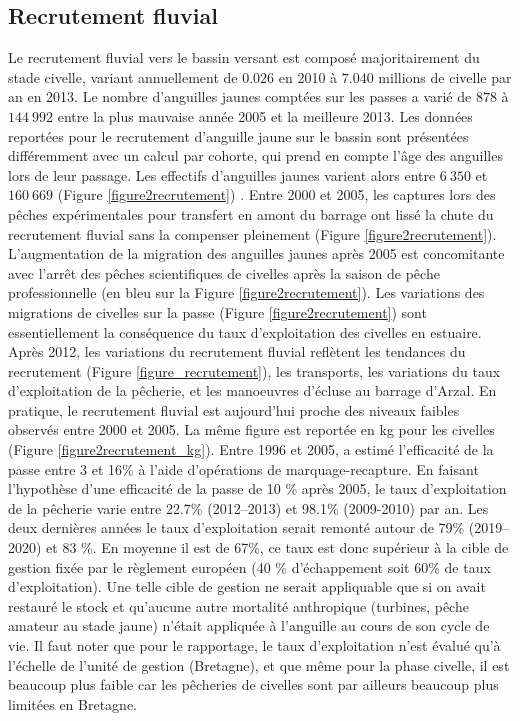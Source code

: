 \documentclass[10pt,twocolumn,titlepage,twoside]{article}\usepackage[]{graphicx}\usepackage[]{color}
\begin{document}
\subsection{Recrutement fluvial}


Le recrutement fluvial vers le bassin versant
est composé majoritairement du stade civelle, variant annuellement de
$0.026$ en 2010 à
$7.040$ millions de civelle par an en 
2013. 
Le nombre d'anguilles jaunes comptées sur les passes a varié de
$878$ à  $144~992$
entre la plus mauvaise année 2005 et la meilleure
2013. Les données reportées pour le recrutement
d'anguille jaune sur le bassin sont présentées différemment avec un calcul par
cohorte, qui prend en compte l'âge des anguilles lors de leur passage. Les
effectifs d'anguilles jaunes varient alors entre
$6~350$ et $160~669$ 
(Figure \ref{figure2recrutement}) \citep{briand_gestion_2017}.
Entre 2000 et 2005, les captures lors des pêches expérimentales pour
transfert en amont du barrage ont lissé la chute du recrutement fluvial sans la
compenser pleinement (Figure \ref{figure2recrutement}). L'augmentation de la
migration des anguilles jaunes après 2005 est concomitante avec
l'arrêt des pêches scientifiques de civelles
après la saison de pêche professionnelle (en bleu sur la Figure
\ref{figure2recrutement}). Les variations des migrations de civelles sur la
passe (Figure \ref{figure2recrutement}) sont essentiellement la conséquence du taux
d'exploitation des civelles en estuaire.
Après 2012, les variations du recrutement fluvial reflètent les tendances du
recrutement (Figure \ref{figure_recrutement}), les transports, les variations
du taux d'exploitation de la pêcherie, et les manoeuvres d'écluse au barrage
d'Arzal. En pratique, le recrutement fluvial est aujourd'hui proche des
niveaux faibles observés entre 2000 et 2005. La même figure est reportée en kg
pour les civelles (Figure \ref{figure2recrutement_kg}).
Entre 1996 et 2005, \citet{briand_dynamique_2009} a estimé l'efficacité de la
passe entre 3 et 16\% à l'aide d'opérations de marquage-recapture. En faisant
l'hypothèse d'une efficacité de la passe de 10 \% après 2005, le taux d'exploitation de la
pêcherie varie entre 22.7\% (2012--2013) et 98.1\% (2009-2010) par an. Les deux
dernières années le taux d'exploitation serait remonté autour de 79\%
(2019--2020) et 83 \%. En moyenne il est de 67\%, ce taux est donc supérieur
à la cible de gestion fixée par le règlement européen (40 \% d'échappement soit
60\% de taux d'exploitation). Une telle cible de gestion ne serait appliquable
que si on avait restauré le stock et qu'aucune autre mortalité anthropique
(turbines, pêche amateur au stade jaune) n'était appliquée à l'anguille au
cours de son cycle de vie.
Il faut noter que pour le rapportage, le taux d'exploitation n'est évalué qu'à l'échelle 
de l'unité de gestion (Bretagne), et que même pour la phase civelle, il est
beaucoup plus faible car les pêcheries de civelles sont par ailleurs beaucoup
plus limitées en Bretagne.
\end{document}
